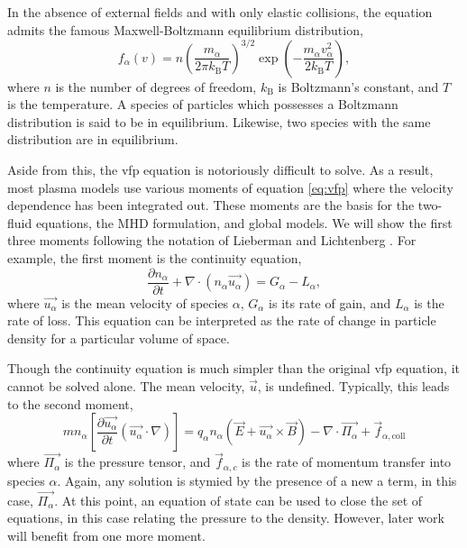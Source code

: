 In the absence of external fields and with only elastic collisions, the
equation admits the famous Maxwell-Boltzmann equilibrium distribution,
\begin{equation}\label{eq:mb}
  f_\alpha(v) = n\left(\frac{m_\alpha}{2\pi k_\mathrm{B}T}\right)^{3/2}
    \exp\left(-\frac{m_\alpha v_\alpha^2}{2k_\mathrm{B}T}\right),
\end{equation}
where $n$ is the number of degrees of freedom, $k_\mathrm{B}$ is
Boltzmann's constant, and $T$ is the temperature. A species of particles
which possesses a Boltzmann distribution is said to be in equilibrium.
Likewise, two species with the same distribution are in equilibrium.


Aside from this, the \acs{vfp} equation is notoriously difficult to
solve. As a result, most plasma models use various moments of equation
\ref{eq:vfp} where the velocity dependence has been integrated out.
These moments are the basis for the two-fluid equations, the MHD
formulation, and global models. We will show the first three moments
following the notation of Lieberman and Lichtenberg
\cite{Lieberman2005}. For example, the first moment is the continuity
equation,
\begin{equation}\label{eq:cont}
  \frac{\partial n_\alpha}{\partial t} + \nabla \cdot (n_\alpha \vec{u_\alpha})
  = G_\alpha - L_\alpha,
\end{equation}
where $\vec{u_\alpha}$ is the mean velocity of species $\alpha$,
$G_\alpha$ is its rate of gain, and $L_\alpha$ is the rate of loss. This
equation can be interpreted as the rate of change in particle density
for a particular volume of space.

Though the continuity equation is much simpler than the original
\acs{vfp} equation, it cannot be solved alone. The mean velocity,
$\vec{u}$, is undefined. Typically, this leads to the second moment,
\begin{equation}\label{eq:mom}
  mn_\alpha\left[\frac{\partial \vec{u_\alpha}}{\partial t}
  (\vec{u_\alpha}\cdot \nabla)\right] = q_\alpha n_\alpha(\vec{E} +
  \vec{u_\alpha} \times \vec{B}) - \nabla \cdot \vec{\Pi_\alpha} +
  \vec{f}_{\alpha,\mathrm{coll}}
\end{equation}
where $\vec{\Pi_\alpha}$ is the pressure tensor, and
$\vec{f}_{\alpha,c}$ is the rate of momentum transfer into species
$\alpha$. Again, any solution is stymied by the presence of a new a
term, in this case, $\vec{\Pi_\alpha}$. At this point, an equation of
state can be used to close the set of equations, in this case relating
the pressure to the density. However, later work will benefit from one
more moment.

